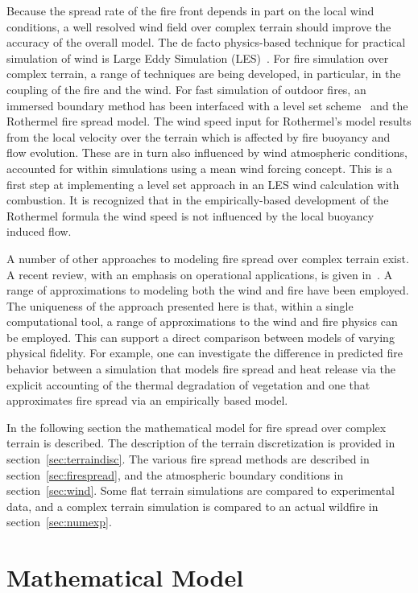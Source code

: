 \documentclass[journal,article,atmosphere,submit,moreauthors,pdftex]{Definitions/mdpi}
\begin{document}
Because the spread rate of the fire front depends in part on the local wind conditions, a well resolved wind field over complex terrain should improve the accuracy of the overall model. The de facto physics-based technique for practical simulation of wind is Large Eddy Simulation (LES)~\cite{Linn:2007,coen_2013,Mell:IJWF2007}. For fire simulation over complex terrain, a range of techniques are being developed, in particular, in the coupling of the fire and the wind. For fast simulation of outdoor fires, an immersed boundary method has been interfaced with a level set scheme~\cite{Bova:IJWF2015} and the Rothermel fire spread model. The wind speed input for Rothermel's model results from the local velocity over the terrain which is affected by fire buoyancy and flow evolution. These are in turn also influenced by wind atmospheric conditions, accounted for within simulations using a mean wind forcing concept. This is a first step at implementing a level set approach in an LES wind calculation with combustion. It is recognized that in the empirically-based development of the Rothermel formula the wind speed is not influenced by the local buoyancy induced flow.

A number of other approaches to modeling fire spread over complex terrain exist. A recent review, with an emphasis on operational applications, is given in~\cite{Arca_2019}. A range of approximations to modeling both the wind and fire have been employed. The uniqueness of the approach presented here is that, within a single computational tool, a range of approximations to the wind and fire physics can be employed. This can support a direct comparison between models of varying physical fidelity. For example, one can investigate the difference in predicted fire behavior between a simulation that models fire spread and heat release via the explicit accounting of the thermal degradation of vegetation and one that approximates fire spread via an empirically based model. 

In the following section the mathematical model for fire spread over complex terrain is described. The description of the terrain discretization is provided in section~\ref{sec:terraindisc}. The various fire spread methods are described in section~\ref{sec:firespread}, and the atmospheric boundary conditions in section~\ref{sec:wind}. Some flat terrain simulations are compared to experimental data, and a complex terrain simulation is compared to an actual wildfire in section~\ref{sec:numexp}. 


\section{Mathematical Model} \label{sec:matmodel}
\end{document}
